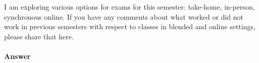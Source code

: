 \documentclass{article}
\begin{document}
I am exploring various options for exams for this semester: take-home,
in-person, synchronous online.  If you have any comments about what worked or
did not work in previous semesters with respect to classes in blended and online
settings, please share that here.

\paragraph{Answer}






\collab{\todo{}}
\end{document}
